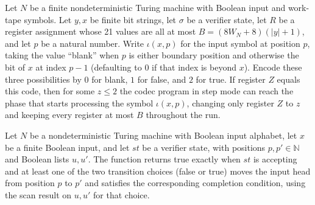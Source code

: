 \begin{theorem}
\label{Complexity.Codec.z_run}
\leanok
{}
Let $N$ be a finite nondeterministic Turing machine with Boolean input and work-tape
symbols. Let $y,x$ be finite bit strings, let $\sigma$ be a verifier state, let $R$ be a
register assignment whose 21 values are all at most $B=(8W_N+8)(|y|+1)$, and let $p$ be
a natural number. Write $\iota(x,p)$ for the input symbol at position $p$, taking the
value “blank” when $p$ is either boundary position and otherwise the bit of $x$ at index
$p-1$ (defaulting to $0$ if that index is beyond $x$). Encode these three possibilities
by $0$ for blank, $1$ for false, and $2$ for true. If register $Z$ equals this code,
then for some $z\le 2$ the codec program in step mode can reach the phase that starts
processing the symbol $\iota(x,p)$, changing only register $Z$ to $z$ and keeping every
register at most $B$ throughout the run.
\end{theorem}

\begin{definition}
\label{Complexity.Codec.stepAns}
\leanok
{}
Let $N$ be a nondeterministic Turing machine with Boolean input alphabet, let $x$ be a
finite Boolean input, and let $st$ be a verifier state, with positions
$p,p'\in\mathbb{N}$ and Boolean lists $u,u'$. The function returns true exactly when
$st$ is accepting and at least one of the two transition choices (false or true) moves
the input head from position $p$ to $p'$ and satisfies the corresponding completion
condition, using the scan result on $u,u'$ for that choice.
\end{definition}

